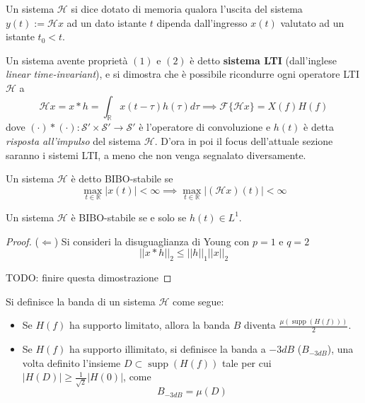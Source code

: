     \begin{definition}
        Un sistema $\mathcal{H}$ si dice dotato di memoria qualora l'uscita del sistema $y(t) := \mathcal{H} x$ ad un dato istante $t$ dipenda dall'ingresso $x(t)$ valutato ad un istante $t_0 < t$.
    \end{definition}

    Un sistema avente proprietà $(1)$ e $(2)$ è detto \textbf{sistema LTI} (dall'inglese \textit{linear time-invariant}), e si dimostra che è possibile ricondurre ogni operatore LTI $\mathcal{H}$ a
    \[
        \mathcal{H} x = x * h = \int_{\mathbb{R}} x(t - \tau) h(\tau) d\tau \implies \mathcal{F}\{ \mathcal{H} x \} = X(f) H(f)
    \]
    dove $(\cdot) * (\cdot): \mathcal{S}' \times \mathcal{S}' \rightarrow \mathcal{S}'$ è l'operatore di convoluzione e $h(t)$ è detta \textit{risposta all'impulso} del sistema $\mathcal{H}$. 
    D'ora in poi il focus dell'attuale sezione saranno i sistemi LTI, a meno che non venga segnalato diversamente.

    \begin{definition}
        Un sistema $\mathcal{H}$ è detto BIBO-stabile se
        \[
            \max_{t \in \mathbb{R}} |x(t)| < \infty \implies \max_{t \in \mathbb{R}} |(\mathcal{H} x)(t)| < \infty
        \]
    \end{definition}

    \begin{proposition}
        Un sistema $\mathcal{H}$ è BIBO-stabile se e solo se $h(t) \in L^1$.
    \end{proposition}
    \begin{proof}
        ($\Leftarrow$) Si consideri la disuguaglianza di Young con $p = 1$ e $q = 2$
        \[
            ||x * h||_{2} \leq ||h||_{1} ||x||_{2}
        \]

        TODO: finire questa dimostrazione
    \end{proof}

    \begin{definition}
        Si definisce la banda di un sistema $\mathcal{H}$ come segue:
        \begin{itemize}
            \item Se $H(f)$ ha supporto limitato, allora la banda $B$ diventa $\frac{\mu(\operatorname{supp}(H(f)))}{2}$.
            \item Se $H(f)$ ha supporto illimitato, si definisce la banda a $-3dB$ ($B_{-3dB}$), una volta definito l'insieme $D \subset \operatorname{supp}(H(f))$ tale per cui $|H(D)| \geq \frac{1}{\sqrt{2}} |H(0)|$, come
            \[
                B_{-3dB} = \mu(D)
            \]
        \end{itemize}
    \end{definition}

